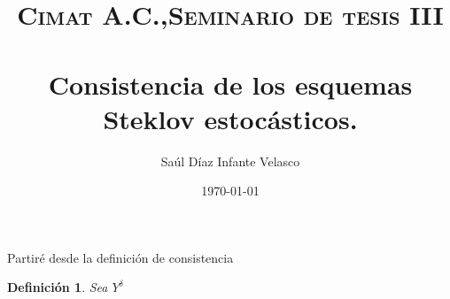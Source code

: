 \documentclass[paper=a4, fontsize=11pt]{scrartcl} %
\title{
\normalfont \normalsize
\textsc{Cimat A.C.,Seminario de tesis III}\\[25pt]
\horrule{0.5pt} \\[0.4cm]
\huge
Consistencia de los esquemas Steklov estoc\'asticos.
\horrule{2pt} \\[0.5cm]
}
\author{Sa\'ul D\'iaz Infante Velasco} %
\date{\normalsize\today} %
\newtheorem{definition}{Definici\'on}
\numberwithin{equation}{section}
\numberwithin{figure}{section}
\numberwithin{table}{section}
\begin{document}
  \maketitle
  
  Partir\'e desde la definición de consistencia
  \begin{definition}
	Sea $Y^{\delta}$
  \end{definition}
\end{document}
